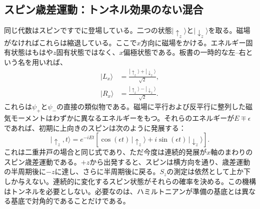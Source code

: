\subsection{スピン歳差運動：トンネル効果のない混合}

同じ代数はスピンですでに登場している。二つの状態\(|\uparrow_z\rangle\)と\(|\downarrow_z\rangle\)を取る。磁場がなければこれらは縮退している。ここで\(x\)方向に磁場をかける。エネルギー固有状態はもはや\(z\)固有状態ではなく、\(x\)偏極状態である。板書の一時的な左--右という名を用いれば、
\begin{align}
|L_x\rangle &= \frac{|\uparrow_z\rangle+|\downarrow_z\rangle}{\sqrt{2}},\\
|R_x\rangle &= \frac{|\uparrow_z\rangle-|\downarrow_z\rangle}{\sqrt{2}}.
\end{align}
これらは\(\psi_+\)と\(\psi_-\)の直接の類似物である。磁場に平行および反平行に整列した磁気モーメントはわずかに異なるエネルギーをもつ。それらのエネルギーが\(E\mp\epsilon\)であれば、初期に上向きのスピンは次のように発展する：
\begin{equation}
|\uparrow_z,t\rangle
= e^{-iEt}\left[\cos(\epsilon t)\,|\uparrow_z\rangle
+ i\sin(\epsilon t)\,|\downarrow_z\rangle\right].
\end{equation}
これは二重井戸の場合と同じ式であり、ただ今度は連続的発展が\(x\)軸のまわりのスピン歳差運動である。\(+z\)から出発すると、スピンは横方向を通り、歳差運動の半周期後に\(-z\)に達し、さらに半周期後に戻る。\(S_z\)の測定は依然として上か下しか与えない。連続的に変化するスピン状態がそれらの確率を決める。この機構はトンネルを必要としない。必要なのは、ハミルトニアンが準備の基底とは異なる基底で対角的であることだけである。

\begin{classroomqa}
\end{classroomqa}

\begin{classroomqa}
\end{classroomqa}

